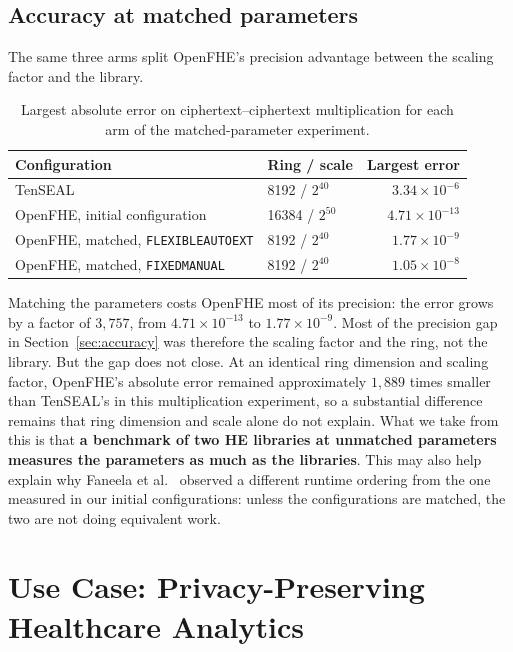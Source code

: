 \documentclass[11pt,a4paper]{article}
\begin{document}
\subsection{Accuracy at matched parameters}\label{sec:matchedacc}

The same three arms split OpenFHE's precision advantage between the scaling factor
and the library.

\begin{table}[H]\centering\small
\begin{tabular}{@{}llr@{}}
\toprule
\textbf{Configuration} & \textbf{Ring / scale} & \textbf{Largest error} \\
\midrule
TenSEAL                            & 8192 / $2^{40}$  & $3.34\times10^{-6}$ \\
OpenFHE, initial configuration     & 16384 / $2^{50}$ & $4.71\times10^{-13}$ \\
OpenFHE, matched, \texttt{FLEXIBLEAUTOEXT} & 8192 / $2^{40}$ & $1.77\times10^{-9}$ \\
OpenFHE, matched, \texttt{FIXEDMANUAL}      & 8192 / $2^{40}$ & $1.05\times10^{-8}$ \\
\bottomrule
\end{tabular}
\caption{Largest absolute error on ciphertext--ciphertext multiplication for each
arm of the matched-parameter experiment.}
\end{table}

Matching the parameters costs OpenFHE most of its precision: the error grows by a
factor of $3{,}757$, from $4.71\times10^{-13}$ to $1.77\times10^{-9}$. Most of the
precision gap in Section~\ref{sec:accuracy} was therefore the scaling factor and the
ring, not the library. But the gap does not close. At an identical ring dimension
and scaling factor, OpenFHE's absolute error remained approximately $1{,}889$ times
smaller than TenSEAL's in this multiplication experiment, so a substantial
difference remains that ring dimension and scale alone do not explain. 
What we take from this is that \textbf{a benchmark of two HE libraries at unmatched
parameters measures the parameters as much as the libraries}. This may also help explain why Faneela
et al.~\cite{faneela2025} observed a different runtime ordering from the one measured
in our initial configurations: unless the configurations are matched, the two are not
doing equivalent work.

\section{Use Case: Privacy-Preserving Healthcare Analytics}\label{sec:usecase}
\end{document}
